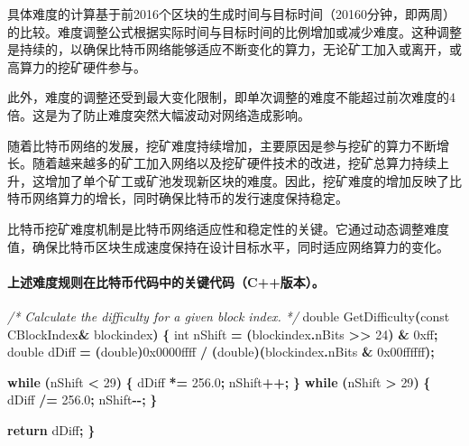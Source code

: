 \documentclass[
]{article}
\newenvironment{Shaded}{\begin{snugshade}}{\end{snugshade}}
\newcommand{\AttributeTok}[1]{\textcolor[rgb]{0.13,0.29,0.53}{#1}}
\newcommand{\BaseNTok}[1]{\textcolor[rgb]{0.00,0.00,0.81}{#1}}
\newcommand{\CommentTok}[1]{\textcolor[rgb]{0.56,0.35,0.01}{\textit{#1}}}
\newcommand{\ControlFlowTok}[1]{\textcolor[rgb]{0.13,0.29,0.53}{\textbf{#1}}}
\newcommand{\DataTypeTok}[1]{\textcolor[rgb]{0.13,0.29,0.53}{#1}}
\newcommand{\DecValTok}[1]{\textcolor[rgb]{0.00,0.00,0.81}{#1}}
\newcommand{\FloatTok}[1]{\textcolor[rgb]{0.00,0.00,0.81}{#1}}
\newcommand{\NormalTok}[1]{#1}
\newcommand{\OperatorTok}[1]{\textcolor[rgb]{0.81,0.36,0.00}{\textbf{#1}}}
\begin{document}
具体难度的计算基于前2016个区块的生成时间与目标时间（20160分钟，即两周）的比较。难度调整公式根据实际时间与目标时间的比例增加或减少难度。这种调整是持续的，以确保比特币网络能够适应不断变化的算力，无论矿工加入或离开，或高算力的挖矿硬件参与。

此外，难度的调整还受到最大变化限制，即单次调整的难度不能超过前次难度的4倍。这是为了防止难度突然大幅波动对网络造成影响。

随着比特币网络的发展，挖矿难度持续增加，主要原因是参与挖矿的算力不断增长。随着越来越多的矿工加入网络以及挖矿硬件技术的改进，挖矿总算力持续上升，这增加了单个矿工或矿池发现新区块的难度。因此，挖矿难度的增加反映了比特币网络算力的增长，同时确保比特币的发行速度保持稳定。

比特币挖矿难度机制是比特币网络适应性和稳定性的关键。它通过动态调整难度值，确保比特币区块生成速度保持在设计目标水平，同时适应网络算力的变化。

\paragraph{上述难度规则在比特币代码中的关键代码（C++版本）。}\label{ux4e0aux8ff0ux96beux5ea6ux89c4ux5219ux5728ux6bd4ux7279ux5e01ux4ee3ux7801ux4e2dux7684ux5173ux952eux4ee3ux7801cux7248ux672c}

\begin{Shaded}
\begin{Highlighting}[numbers=left,,]
\CommentTok{/* Calculate the difficulty for a given block index.}
\CommentTok{ */}
\DataTypeTok{double}\NormalTok{ GetDifficulty}\OperatorTok{(}\AttributeTok{const}\NormalTok{ CBlockIndex}\OperatorTok{\&}\NormalTok{ blockindex}\OperatorTok{)}
\OperatorTok{\{}
    \DataTypeTok{int}\NormalTok{ nShift }\OperatorTok{=} \OperatorTok{(}\NormalTok{blockindex}\OperatorTok{.}\NormalTok{nBits }\OperatorTok{\textgreater{}\textgreater{}} \DecValTok{24}\OperatorTok{)} \OperatorTok{\&} \BaseNTok{0xff}\OperatorTok{;}
    \DataTypeTok{double}\NormalTok{ dDiff }\OperatorTok{=}
        \OperatorTok{(}\DataTypeTok{double}\OperatorTok{)}\BaseNTok{0x0000ffff} \OperatorTok{/} \OperatorTok{(}\DataTypeTok{double}\OperatorTok{)(}\NormalTok{blockindex}\OperatorTok{.}\NormalTok{nBits }\OperatorTok{\&} \BaseNTok{0x00ffffff}\OperatorTok{);}

    \ControlFlowTok{while} \OperatorTok{(}\NormalTok{nShift }\OperatorTok{\textless{}} \DecValTok{29}\OperatorTok{)}
    \OperatorTok{\{}
\NormalTok{        dDiff }\OperatorTok{*=} \FloatTok{256.0}\OperatorTok{;}
\NormalTok{        nShift}\OperatorTok{++;}
    \OperatorTok{\}}
    \ControlFlowTok{while} \OperatorTok{(}\NormalTok{nShift }\OperatorTok{\textgreater{}} \DecValTok{29}\OperatorTok{)}
    \OperatorTok{\{}
\NormalTok{        dDiff }\OperatorTok{/=} \FloatTok{256.0}\OperatorTok{;}
\NormalTok{        nShift}\OperatorTok{{-}{-};}
    \OperatorTok{\}}

    \ControlFlowTok{return}\NormalTok{ dDiff}\OperatorTok{;}
\OperatorTok{\}}
\end{Highlighting}
\end{Shaded}
\end{document}
